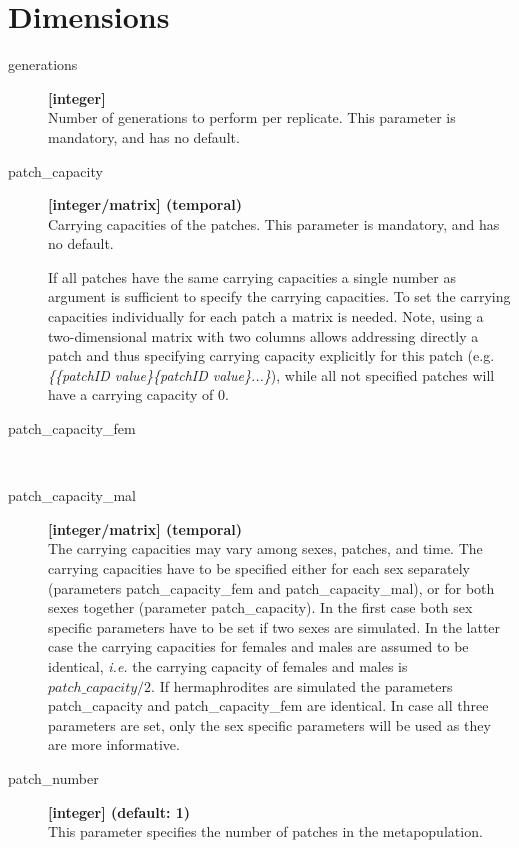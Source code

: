 \documentclass[letterpaper,12pt,oneside]{book}
\begin{document}
\section{Dimensions}
\begin{description}

\item[generations]\textbf{[integer]}\\
Number of generations to perform per replicate. This parameter is mandatory, and has no default.
\item[patch\_capacity]
\textbf{[integer/matrix] (temporal)}\\
Carrying capacities of the patches. This parameter is mandatory, and has no default.

 If all patches have the same carrying capacities a single number as argument is sufficient to specify the carrying capacities. To set the carrying capacities individually for each patch a matrix is needed. Note, using a two-dimensional matrix with two columns allows addressing directly a patch and thus specifying carrying capacity explicitly for this patch (e.g. \textit{\{\{patchID value\}\{patchID value\}...\}}), while all not specified patches will have a carrying capacity of 0. 


\item[patch\_capacity\_fem]\hspace*{\fill}\\
\vspace{-9mm}
\item[patch\_capacity\_mal]\textbf{[integer/matrix] (temporal)}\\
The carrying capacities may vary among sexes, patches, and time. The carrying capacities have to be specified either for each sex separately (parameters \textsf{patch\_capacity\_fem} and \textsf{patch\_capacity\_mal}), or for both sexes together (parameter \textsf{patch\_capacity}). In the first case both sex specific parameters have to be set if two sexes are simulated. In the latter case the carrying capacities for females and males are assumed to be identical, \textit{i.e.} the carrying capacity of females and males is $patch\_capacity/2$. If hermaphrodites are simulated the parameters \textsf{patch\_capacity} and \textsf{patch\_capacity\_fem} are identical. In case all three parameters are set, only the sex specific parameters will be used as they are more informative.
\item[patch\_number] \textbf{[integer] (default: 1)}\\ 
This parameter specifies the number of patches in the metapopulation.
\end{description}
\end{document}
